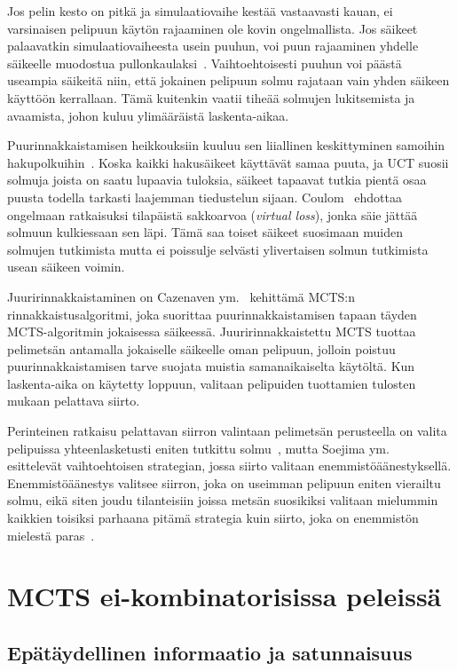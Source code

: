\documentclass[12pt,finnish]{tktltiki2}
\theoremstyle{definition}
\theoremstyle{remark}
\begin{document}
Jos pelin kesto on pitkä ja simulaatiovaihe kestää vastaavasti kauan, ei varsinaisen pelipuun käytön rajaaminen ole kovin ongelmallista. Jos säikeet palaavatkin simulaatiovaiheesta usein puuhun, voi puun rajaaminen yhdelle säikeelle muodostua pullonkaulaksi~\cite{chaslot}. Vaihtoehtoisesti puuhun voi päästä useampia säikeitä niin, että jokainen pelipuun solmu rajataan vain yhden säikeen käyttöön kerrallaan. Tämä kuitenkin vaatii tiheää solmujen lukitsemista ja avaamista, johon kuluu ylimääräistä laskenta-aikaa.

Puurinnakkaistamisen heikkouksiin kuuluu sen liiallinen keskittyminen samoihin hakupolkuihin~\cite{browne, chaslot}. Koska kaikki hakusäikeet käyttävät samaa puuta, ja UCT suosii solmuja joista on saatu lupaavia tuloksia, säikeet tapaavat tutkia pientä osaa puusta todella tarkasti laajemman tiedustelun sijaan. Coulom~\cite{chaslot} ehdottaa ongelmaan ratkaisuksi tilapäistä sakkoarvoa (\textit{virtual loss}), jonka säie jättää solmuun kulkiessaan sen läpi. Tämä saa toiset säikeet suosimaan muiden solmujen tutkimista mutta ei poissulje selvästi ylivertaisen solmun tutkimista usean säikeen voimin.

Juuririnnakkaistaminen on Cazenaven ym.~\cite{cazenave} kehittämä MCTS:n rinnakkaistusalgoritmi, joka suorittaa puurinnakkaistamisen tapaan täyden MCTS-algoritmin jokaisessa säikeessä. Juuririnnakkaistettu MCTS tuottaa pelimetsän antamalla jokaiselle säikeelle oman pelipuun, jolloin poistuu puurinnakkaistamisen tarve suojata muistia samanaikaiselta käytöltä. Kun laskenta-aika on käytetty loppuun, valitaan pelipuiden tuottamien tulosten mukaan pelattava siirto.

Perinteinen ratkaisu pelattavan siirron valintaan pelimetsän perusteella on valita pelipuissa yhteenlasketusti eniten tutkittu solmu~\cite{browne}, mutta Soejima ym.~\cite{soejima} esittelevät vaihtoehtoisen strategian, jossa siirto valitaan enemmistöäänestyksellä. Enemmistöäänestys valitsee siirron, joka on useimman pelipuun eniten vierailtu solmu, eikä siten joudu tilanteisiin joissa metsän suosikiksi valitaan mielummin kaikkien toisiksi parhaana pitämä strategia kuin siirto, joka on enemmistön mielestä paras~\cite{soejima}.


\section{MCTS ei-kombinatorisissa peleissä}

\subsection{Epätäydellinen informaatio ja satunnaisuus}
\end{document}
